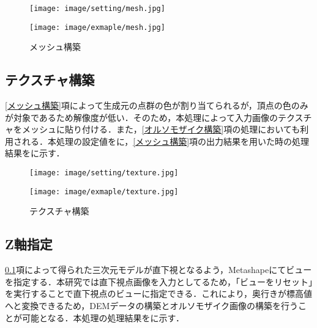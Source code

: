       \begin{figure}[t]
        \begin{minipage}[c]{0.45\hsize}
          \centering
          \texttt{[image: image/setting/mesh.jpg]}
          \label{メッシュ構築設定値}
        \end{minipage}
        \begin{minipage}[c]{0.45\hsize}
          \centering
          \texttt{[image: image/exmaple/mesh.jpg]}
          \label{メッシュ構築結果}
        \end{minipage}
        \caption{メッシュ構築}
      \end{figure}


    \subsection{テクスチャ構築}
      \label{テクスチャ構築}
      \ref{メッシュ構築}項によって生成元の点群の色が割り当てられるが，頂点の色のみが対象であるため解像度が低い．そのため，本処理によって入力画像のテクスチャをメッシュに貼り付ける．また，\ref{オルソモザイク構築}項の処理においても利用される．本処理の設定値をに，\ref{メッシュ構築}項の出力結果を用いた時の処理結果をに示す．

      \begin{figure}[t]
        \begin{minipage}[c]{0.45\hsize}
          \centering
          \texttt{[image: image/setting/texture.jpg]}
          \label{テクスチャ構築設定値}
        \end{minipage}
        \begin{minipage}[c]{0.45\hsize}
          \centering
          \texttt{[image: image/exmaple/texture.jpg]}
          \label{テクスチャ構築結果}
        \end{minipage}
        \caption{テクスチャ構築}
      \end{figure}


    \subsection{Z軸指定}
      \label{Z軸指定}
      \ref{テクスチャ構築}項によって得られた三次元モデルが直下視となるよう，Metashapeにてビューを指定する．本研究では直下視点画像を入力としてるため，「ビューをリセット」を実行することで直下視点のビューに指定できる．これにより，奥行きが標高値へと変換できるため，DEMデータの構築とオルソモザイク画像の構築を行うことが可能となる．本処理の処理結果をに示す．

